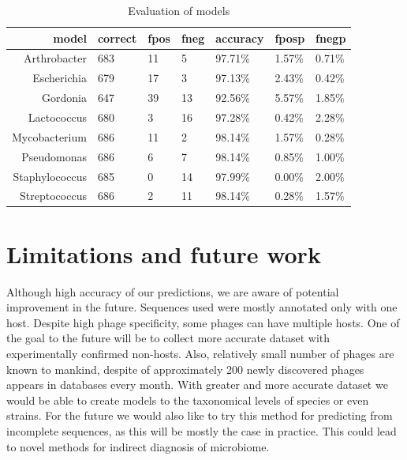 \begin{table}
  \centering
    \begin{tabular}{ r l l l l l l }
	\hline
	model & correct & fpos & fneg & accuracy & fposp & fnegp \\
	\hline
	Arthrobacter & 683 & 11 & 5  & 97.71\% & 1.57\% & 0.71\% \\
	Escherichia & 679 & 17 & 3  & 97.13\% & 2.43\% & 0.42\% \\
	Gordonia & 647 & 39 & 13 & 92.56\% & 5.57\% & 1.85\% \\
	Lactococcus & 680 & 3  & 16 & 97.28\% & 0.42\% & 2.28\% \\
	Mycobacterium & 686 & 11 & 2  & 98.14\% & 1.57\% & 0.28\% \\
	Pseudomonas & 686 & 6  & 7  & 98.14\% & 0.85\% & 1.00\% \\
	Staphylococcus & 685 & 0  & 14 & 97.99\% & 0.00\% & 2.00\% \\
	Streptococcus & 686 & 2  & 11 & 98.14\% & 0.28\% & 1.57\% \\
	\end{tabular}
	\bigskip
    \caption{Evaluation of models}
    \label{tab:models}
\end{table}

\section{Limitations and future work}
Although high accuracy of our predictions, we are aware of potential improvement in the future.
Sequences used were mostly annotated only with one host. 
Despite high phage specificity, some phages can have multiple hosts.
One of the goal to the future will be to collect more accurate dataset with experimentally confirmed non-hosts.
Also, relatively small number of phages are known to mankind, despite of approximately 200 newly discovered phages appears in databases every month. 
With greater and more accurate dataset we would be able to create models to the taxonomical levels of species or even strains.
For the future we would also like to try this method for predicting from incomplete sequences, as this will be mostly the case in practice.
This could lead to novel methods for indirect diagnosis of microbiome.

